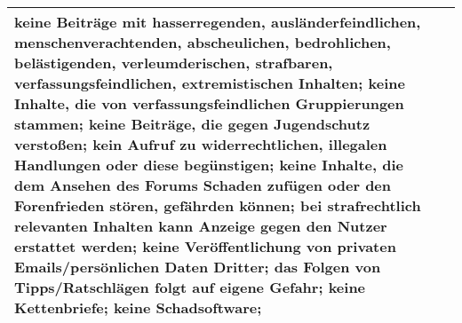 \begin{landscape}
\begin{longtable}{lp{170mm}}
  keine Beiträge mit hasserregenden, ausländerfeindlichen, menschenverachtenden,
  abscheulichen, bedrohlichen, belästigenden, verleumderischen, strafbaren,
  verfassungsfeindlichen, extremistischen Inhalten; keine Inhalte, die von
  verfassungsfeindlichen Gruppierungen stammen; keine Beiträge, die gegen
  Jugendschutz verstoßen; kein Aufruf zu widerrechtlichen, illegalen Handlungen
  oder diese begünstigen; keine Inhalte, die dem Ansehen des Forums Schaden
  zufügen oder den Forenfrieden stören, gefährden können; bei strafrechtlich
  relevanten Inhalten kann Anzeige gegen den Nutzer erstattet werden;  keine
  Veröffentlichung von privaten Emails/persönlichen Daten Dritter; das Folgen
  von Tipps/Ratschlägen folgt auf eigene Gefahr; keine Kettenbriefe; keine
  Schadsoftware;\tabularnewline\hline
\end{longtable}
\end{landscape}

